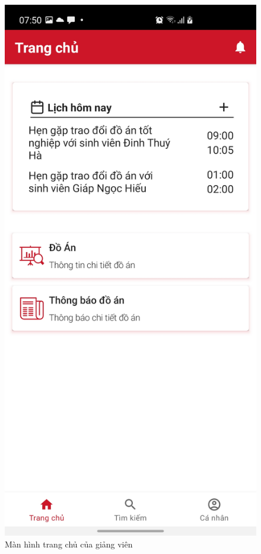 \documentclass[../Main.tex]{subfiles}
\begin{document}
\begin{figure}[H]
\begin{minipage}{0.5\textwidth}
\includegraphics[width=0.60\linewidth]{Figure/screen/screen_home_teacher.jpg}
\caption{Màn hình trang chủ của giảng viên} \label{fig:screen_login}
\end{minipage}
\hspace{\fill}
\begin{minipage}{0.5\textwidth}

\end{minipage}
\end{figure}
\end{document}
